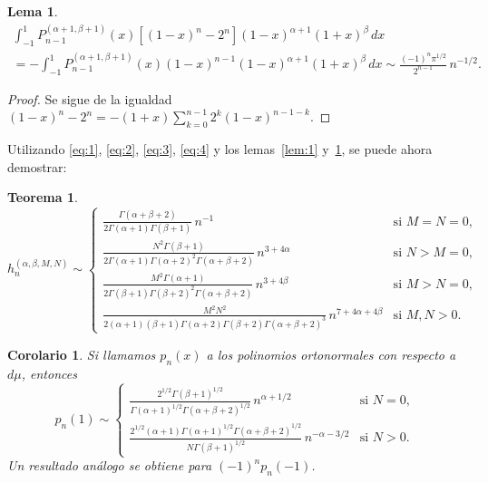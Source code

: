\documentclass[a4paper]{article}
\newtheorem{theorem}{Teorema}
\newtheorem*{corollary*}{Corolario}
\newtheorem{lemma}{Lema}
\begin{document}
\begin{lemma}
\label{lem:2}
\begin{multline*}
\int_{-1}^{1} P^{(\alpha+1,\beta+1)}_{n-1}(x)
[(1-x)^{n}-2^{n}](1-x)^{\alpha+1}(1+x)^{\beta} \,dx \\
= -\int_{-1}^{1} P^{(\alpha+1,\beta+1)}_{n-1}(x)
(1-x)^{n-1}(1-x)^{\alpha+1}(1+x)^{\beta} \,dx 
\sim \frac{(-1)^{n}\pi^{1/2}}{2^{n-1}} \, n^{-1/2}.
\end{multline*}
\end{lemma}

\begin{proof}
Se sigue de la igualdad
$(1-x)^{n}-2^{n} = -(1+x) \sum_{k=0}^{n-1} 2^{k}(1-x)^{n-1-k}$.
\end{proof}

Utilizando \eqref{eq:1}, \eqref{eq:2}, \eqref{eq:3}, \eqref{eq:4}
y los lemas~\ref{lem:1} y~\ref{lem:2}, se puede ahora 
demostrar:

\begin{theorem}
\label{th:1}
$$
h^{(\alpha,\beta,M,N)}_{n} \sim
\begin{cases}
\frac{\Gamma(\alpha+\beta+2)}{2\Gamma(\alpha+1)\Gamma(\beta+1)} 
\, n^{-1} & \text{si } M=N=0, \\[3pt]
\frac{N^{2} \Gamma(\beta+1)}{2\Gamma(\alpha+1)\Gamma(\alpha+2)^{2} \Gamma(\alpha+\beta+2)} 
\, n^{3+4\alpha} & \text{si } N>M=0, \\[3pt]
\frac{M^{2} \Gamma(\alpha+1)}{2\Gamma(\beta+1)\Gamma(\beta+2)^{2} \Gamma(\alpha+\beta+2)} 
\, n^{3+4\beta} & \text{si } M>N=0, \\[3pt]
\frac{M^{2}N^{2}}{2(\alpha+1)(\beta+1)\Gamma(\alpha+2)\Gamma(\beta+2) \Gamma(\alpha+\beta+2)^{3}} 
\, n^{7+4\alpha+4\beta} & \text{si } M,N>0.
\end{cases}
$$
\end{theorem}

\begin{corollary*}
Si llamamos $p_{n}(x)$ a los polinomios ortonormales 
con respecto a~$d\mu$, entonces
$$
p_{n}(1) \sim
\begin{cases}
\frac{2^{1/2}\Gamma(\beta+1)^{1/2}}{\Gamma(\alpha+1)^{1/2} \Gamma(\alpha+\beta+2)^{1/2}} 
\, n^{\alpha+1/2} & \text{si } N=0, \\[4pt]
\frac{2^{1/2}(\alpha+1)\Gamma(\alpha+1)^{1/2} \Gamma(\alpha+\beta+2)^{1/2}}
{N \Gamma(\beta+1)^{1/2}} \, n^{-\alpha-3/2} & \text{si } N>0.
\end{cases}
$$
Un resultado an\'{a}logo se obtiene para $(-1)^{n}p_{n}(-1)$.
\end{corollary*}
\end{document}
